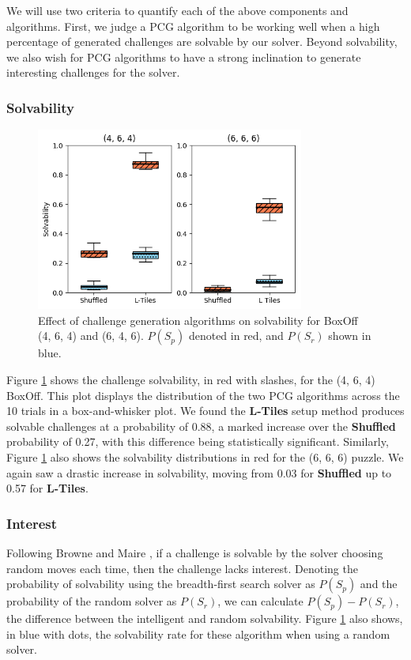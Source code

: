 \documentclass[journal]{IEEEtran}
\begin{document}
We will use two criteria to quantify each of the above components and algorithms.
First, we judge a PCG algorithm to be working well when a high percentage of generated challenges are solvable by our solver. Beyond solvability, we also wish for PCG algorithms to have a strong inclination to generate interesting challenges for the solver. 

\subsubsection{Solvability}

\begin{figure}[t]
\includegraphics[width=8.8cm]{boxoffsolvability.png}
\caption{Effect of challenge generation algorithms on solvability for BoxOff (4, 6, 4) and (6, 4, 6). $P(S_p)$ denoted in red, and $P(S_r)$ shown in blue.}
\label{fig:boxoffsolvediff}
\end{figure}

Figure \ref{fig:boxoffsolvediff} shows the challenge solvability, in red with slashes, for the (4, 6, 4) BoxOff. This plot displays the distribution of the two PCG algorithms across the 10 trials in a box-and-whisker plot.  
We found the {\bf L-Tiles} setup method produces solvable challenges at a probability of 0.88, a marked increase over the {\bf Shuffled} probability of 0.27, with this difference being statistically significant.
Similarly, Figure \ref{fig:boxoffsolvediff} also shows the solvability distributions in red for the (6, 6, 6) puzzle. We again saw a drastic increase in solvability, moving from 0.03 for {\bf Shuffled} up to 0.57 for {\bf L-Tiles}. 

\subsubsection{Interest}

Following Browne and Maire \cite{MCPUZZLE}, if a challenge is solvable by the solver choosing random moves each time, then the challenge lacks interest. Denoting the probability of solvability using the breadth-first search solver as $P(S_p)$ and the probability of the random solver as $P(S_r)$, we can calculate $P(S_p) - P(S_r)$, the difference between the intelligent and random solvability. Figure \ref{fig:boxoffsolvediff} also shows, in blue with dots, the solvability rate for these algorithm when using a random solver. 
\end{document}
